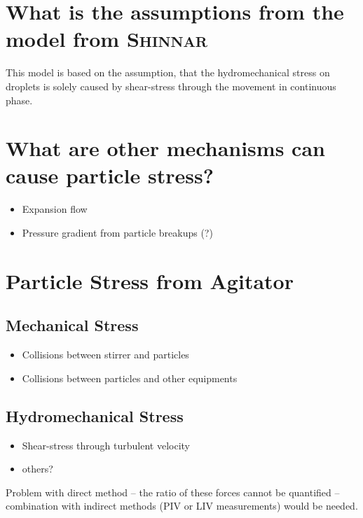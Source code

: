 \section{What is the assumptions from the model from \textsc{Shinnar}}
This model is based on the assumption, that the hydromechanical stress on droplets is solely caused by shear-stress through the movement in continuous phase.
\vspace{5cm}

\section{What are other mechanisms can cause particle stress?}
\begin{itemize}
    \item Expansion flow
    \item Pressure gradient from particle breakups (?)
\end{itemize}
\vspace{5cm}

\section{Particle Stress from Agitator}
\subsection{Mechanical Stress}
\begin{itemize}
    \item Collisions between stirrer and particles
    \item Collisions between particles and other equipments
\end{itemize}
\subsection{Hydromechanical Stress}
\begin{itemize}
    \item Shear-stress through turbulent velocity
    \item others?
\end{itemize}
Problem with direct method -- the ratio of these forces cannot be quantified -- combination with indirect methods (PIV or LIV measurements) would be needed.
\vspace{5cm}

